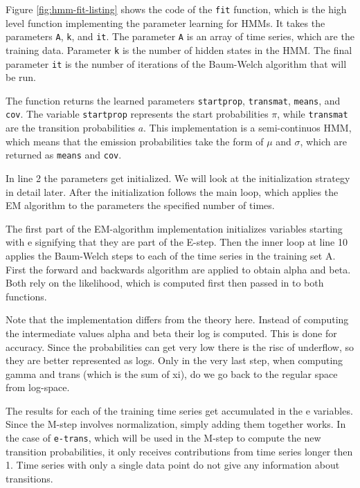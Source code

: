 Figure \ref{fig:hmm-fit-listing} shows the code of the \texttt{fit} function, which is the high level function implementing the parameter learning for HMMs. It takes the parameters \texttt{A}, \texttt{k}, and \texttt{it}. The parameter \texttt{A} is an array of time series, which are the training data. Parameter \texttt{k} is the number of hidden states in the HMM. The final parameter \texttt{it} is the number of iterations of the Baum-Welch algorithm that will be run. 

The function returns the learned parameters \texttt{startprop}, \texttt{transmat}, \texttt{means}, and \texttt{cov}. The variable \texttt{startprop} represents the start probabilities $\pi$, while \texttt{transmat} are the transition probabilities $a$. This implementation is a semi-continuos HMM, which means that the emission probabilities take the form of $\mu$ and $\sigma$, which are returned as \texttt{means} and \texttt{cov}.

In line 2 the parameters get initialized. We will look at the initialization strategy in detail later. After the initialization follows the main loop, which applies the EM algorithm to the parameters the specified number of times. 

The first part of the EM-algorithm implementation initializes variables starting with e signifying that they are part of the E-step. Then the inner loop at line 10 applies the Baum-Welch steps to each of the time series in the training set A. First the forward and backwards algorithm are applied to obtain alpha and beta. Both rely on the likelihood, which is computed first then passed in to both functions. 

Note that the implementation differs from the theory here. Instead of computing the intermediate values alpha and beta their log is computed. This is done for accuracy. Since the probabilities can get very low there is the risc of underflow, so they are better represented as logs. Only in the very last step, when computing gamma and trans (which is the sum of xi), do we go back to the regular space from log-space. 

The results for each of the training time series get accumulated in the e variables. Since the M-step involves normalization, simply adding them together works. In the case of \texttt{e-trans}, which will be used in the M-step to compute the new transition probabilities, it only receives contributions from time series longer then 1. Time series with only a single data point do not give any information about transitions.

